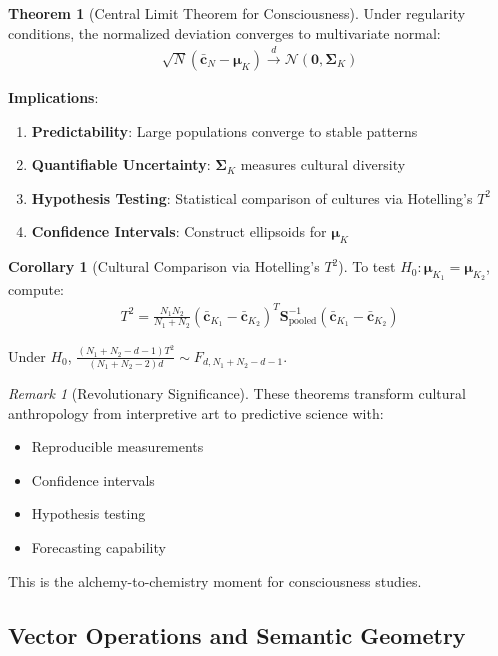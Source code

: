 \documentclass[11pt,a4paper]{article}
\theoremstyle{definition}
\newtheorem{theorem}{Theorem}[section]
\newtheorem{corollary}{Corollary}[section]
\theoremstyle{remark}
\newtheorem{remark}{Remark}[section]
\newcommand{\cc}{\mathbf{c}}
\begin{document}
\begin{theorem}[Central Limit Theorem for Consciousness]
Under regularity conditions, the normalized deviation converges to multivariate normal:
\begin{align}
\sqrt{N}(\bar{\cc}_N - \boldsymbol{\mu}_K) \xrightarrow{d} \mathcal{N}(\mathbf{0}, \boldsymbol{\Sigma}_K)
\end{align}

\textbf{Implications}:
\begin{enumerate}
\item \textbf{Predictability}: Large populations converge to stable patterns
\item \textbf{Quantifiable Uncertainty}: \(\boldsymbol{\Sigma}_K\) measures cultural diversity
\item \textbf{Hypothesis Testing}: Statistical comparison of cultures via Hotelling's \(T^2\)
\item \textbf{Confidence Intervals}: Construct ellipsoids for \(\boldsymbol{\mu}_K\)
\end{enumerate}
\end{theorem}

\begin{corollary}[Cultural Comparison via Hotelling's \(T^2\)]
To test \(H_0: \boldsymbol{\mu}_{K_1} = \boldsymbol{\mu}_{K_2}\), compute:
\begin{align}
T^2 = \frac{N_1 N_2}{N_1 + N_2}(\bar{\cc}_{K_1} - \bar{\cc}_{K_2})^T \mathbf{S}_{\text{pooled}}^{-1} (\bar{\cc}_{K_1} - \bar{\cc}_{K_2})
\end{align}

Under \(H_0\), \(\frac{(N_1+N_2-d-1)T^2}{(N_1+N_2-2)d} \sim F_{d, N_1+N_2-d-1}\).
\end{corollary}

\begin{remark}[Revolutionary Significance]
These theorems transform cultural anthropology from interpretive art to predictive science with:
\begin{itemize}
\item Reproducible measurements
\item Confidence intervals
\item Hypothesis testing
\item Forecasting capability
\end{itemize}

This is the alchemy-to-chemistry moment for consciousness studies.
\end{remark}

\subsection{Vector Operations and Semantic Geometry}
\end{document}
